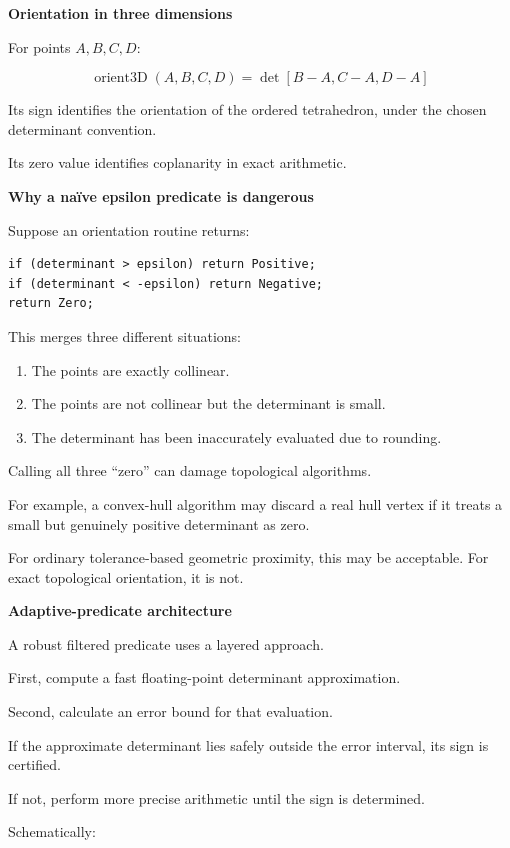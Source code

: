 \textbf{Orientation in three dimensions}

For points \(A,B,C,D\):

\[
\boxed{ \operatorname{orient3D}(A,B,C,D)= \det[B-A,C-A,D-A] }
\]

Its sign identifies the orientation of the ordered tetrahedron, under the chosen determinant convention.

Its zero value identifies coplanarity in exact arithmetic.

\textbf{Why a naïve epsilon predicate is dangerous}

Suppose an orientation routine returns:

\begin{verbatim}
if (determinant > epsilon) return Positive;
if (determinant < -epsilon) return Negative;
return Zero;
\end{verbatim}

This merges three different situations:

\begin{enumerate}
\def\labelenumi{\arabic{enumi}.}
\tightlist
\item
  The points are exactly collinear.
\item
  The points are not collinear but the determinant is small.
\item
  The determinant has been inaccurately evaluated due to rounding.
\end{enumerate}

Calling all three ``zero'' can damage topological algorithms.

For example, a convex-hull algorithm may discard a real hull vertex if it treats a small but genuinely positive determinant as zero.

For ordinary tolerance-based geometric proximity, this may be acceptable. For exact topological orientation, it is not.

\textbf{Adaptive-predicate architecture}

A robust filtered predicate uses a layered approach.

First, compute a fast floating-point determinant approximation.

Second, calculate an error bound for that evaluation.

If the approximate determinant lies safely outside the error interval, its sign is certified.

If not, perform more precise arithmetic until the sign is determined.

Schematically:


